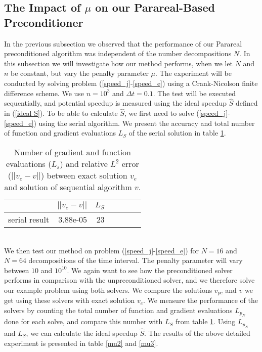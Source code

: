 \subsection{The Impact of $\mu$ on our Parareal-Based Preconditioner}
In the previous subsection we observed that the performance of our Parareal preconditioned algorithm was independent of the number decompositions $N$. In this subsection we will investigate how our method performs, when we let $N$ and $n$ be constant, but vary the penalty parameter $\mu$. The experiment will be conducted by solving problem (\ref{speed_j}-\ref{speed_e}) using a Crank-Nicolson finite difference scheme. We use $n=10^3$ and $\Delta t=0.1$. The test will be executed sequentially, and potential speedup is measured using the ideal speedup $\hat S$ defined in (\ref{ideal S}). To be able to calculate $\hat S$, we first need to solve (\ref{speed_j}-\ref{speed_e}) using the serial algorithm. We present the accuracy and total number of function and gradient evaluations $L_S$ of the serial solution in table \ref{mu1}.
\\ 
\begin{table}[h]
\centering
\caption{Number of gradient and function evaluations ($L_s$) and relative $L^2$ error ($||v_e-v||$) between exact solution $v_e$ and solution of sequential algorithm $v$.} \label{mu1}
\begin{tabular}{lrrllrr}
\toprule
{}  &  $||v_e-v||$  &  $L_S$  \\
\midrule
serial result  &     3.88e-05 &   23    \\
\bottomrule
\end{tabular}
\end{table}
\\
We then test our method on problem (\ref{speed_j}-\ref{speed_e}) for $N=16$ and $N=64$ decompositions of the time interval. The penalty parameter will vary between $10$ and $10^{10}$. We again want to see how the preconditioned solver performs in comparison with the unpreconditioned solver, and we therefore solve our example problem using both solvers. We compare the solutions $v_{pc}$ and $v$ we get using these solvers with exact solution $v_e$. We measure the performance of the solvers by counting the total number of function and gradient evaluations $L_{p_N}$ done for each solve, and compare this number with $L_S$ from table \ref{mu1}. Using $L_{p_N}$ and $L_S$, we can calculate the ideal speedup $\hat S$. The results of the above detailed experiment is presented in table \ref{mu2} and \ref{mu3}.
\\
